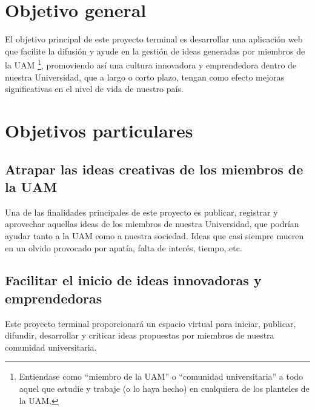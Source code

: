 \documentclass[12pt,letterpaper,titlepage]{article}
\begin{document}
\section{Objetivo general}

El objetivo principal de este proyecto terminal es desarrollar una aplicaci\'on web que facilite la difusi\'on y ayude en la gesti\'on de ideas generadas por miembros de la UAM \footnote{Entiendase como ``miembro de la UAM'' o ``comunidad universitaria'' a todo aquel que estudie y trabaje (o lo haya hecho) en cualquiera de los planteles de la UAM.}, promoviendo as\'i una cultura innovadora y emprendedora dentro de nuestra Universidad, que a largo o corto plazo, tengan como efecto mejoras significativas en el nivel de vida de nuestro pa\'is.


\section{Objetivos particulares}

\subsection{Atrapar las ideas creativas de los miembros de la UAM}
Una de las finalidades principales de este proyecto es publicar, registrar y aprovechar aquellas ideas de los miembros de nuestra Universidad, que podr\'ian ayudar tanto a la UAM como a nuestra sociedad. Ideas que casi siempre mueren en un olvido provocado por apat\'ia, falta de inter\'es, tiempo, etc.

\subsection{Facilitar el inicio de ideas  innovadoras y emprendedoras}
Este proyecto terminal proporcionar\'a un espacio virtual para iniciar, publicar, difundir, desarrollar y criticar ideas propuestas por miembros de nuestra comunidad universitaria.



\end{document}
